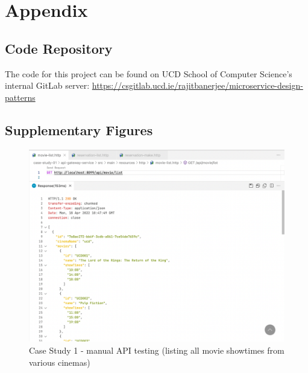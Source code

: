 \chapter{Appendix}


\section{Code Repository}

The code for this project can be found on UCD School of Computer Science's internal GitLab server: \url{https://csgitlab.ucd.ie/rajitbanerjee/microservice-design-patterns}

\section{Supplementary Figures}


\begin{figure}[H]
  \centering
  \includegraphics[width=1.0\linewidth]{./assets/images/case-studies/cs01-manual-1.png}
  \caption{Case Study 1 - manual API testing (listing all movie showtimes from various cinemas)}
  \label{fig:cs01-manual-1}
\end{figure}

